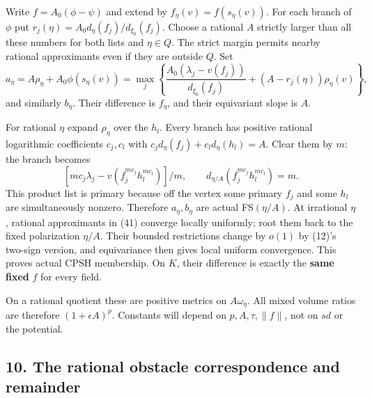 \documentclass[
  10pt,
]{article}
\begin{document}
Write \(f=A_0(\phi-\psi)\) and extend by \(f_\eta(v)=f(s_\eta(v))\). For
each branch of \(\phi\) put \(r_j(\eta)=A_0d_\eta(f_j)/d_{\xi_0}(f_j)\).
Choose a rational \(A\) strictly larger than all these numbers for both
lists and \(\eta\in Q\). The strict margin permits nearby rational
approximants even if they are outside \(Q\). Set
\[ a_\eta=A\rho_\eta+A_0\phi(s_\eta(v))
 =\max_j\left\{\frac{A_0(\lambda_j-v(f_j))}{d_{\xi_0}(f_j)}+(A-r_j(\eta))\rho_\eta(v)\right\},        \tag{41}\]
and similarly \(b_\eta\). Their difference is \(f_\eta\), and their
equivariant slope is \(A\).

For rational \(\eta\) expand \(\rho_\eta\) over the \(h_l\). Every
branch has positive rational logarithmic coefficients \(c_j,c_l\) with
\(c_jd_\eta(f_j)+c_ld_\eta(h_l)=A\). Clear them by \(m\): the branch
becomes \[ [mc_j\lambda_j-v(f_j^{mc_j}h_l^{mc_l})]/m,\qquad
 d_{\eta/A}(f_j^{mc_j}h_l^{mc_l})=m. \] This product list is primary
because off the vertex some primary \(f_j\) and some \(h_l\) are
simultaneously nonzero. Therefore \(a_\eta,b_\eta\) are actual
FS\((\eta/A)\). At irrational \(\eta\), rational approximants in (41)
converge locally uniformly; root them back to the fixed polarization
\(\eta/A\). Their bounded restrictions change by \(o(1)\) by (12)'s
two-sign version, and equivariance then gives local uniform convergence.
This proves actual CPSH membership. On \(K\), their difference is
exactly the \textbf{same fixed} \(f\) for every field.

On a rational quotient these are positive metrics on \(A\omega_\eta\).
All mixed volume ratios are therefore \((1+\epsilon A)^p\). Constants
will depend on \(p,A,\tau,\|f\|\), not on \(sd\) or the potential.

\subsection{10. The rational obstacle correspondence and
remainder}\label{the-rational-obstacle-correspondence-and-remainder}
\end{document}
